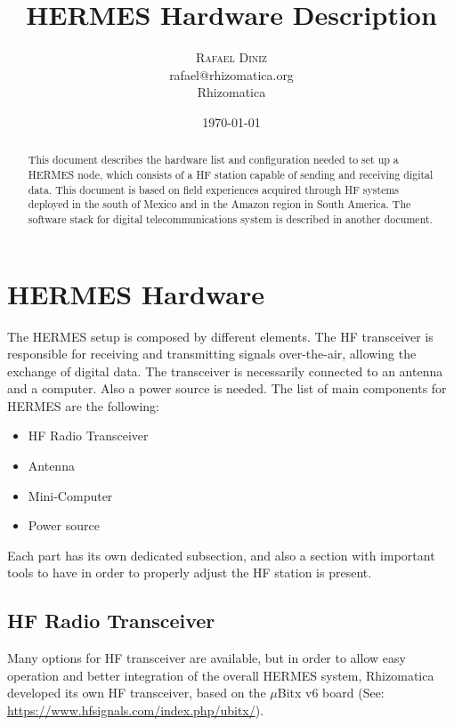 \documentclass[11pt,a4paper]{article}
\title{HERMES Hardware Description}
\author{
       \large
        \textsc{Rafael Diniz}
        \mbox{}\\ %
        rafael@rhizomatica.org\\
        \mbox{Rhizomatica} \\ %
}
\date{\today}
\begin{document}
\maketitle

\begin{abstract}
This document describes the hardware list and configuration needed to set up
a HERMES node, which consists of a HF station capable
of sending and receiving digital data. This document is based on field
experiences acquired through HF systems deployed in the south of Mexico
and in the Amazon region in South America. The software stack for digital
telecommunications system is described in another document.
\end{abstract}

\newpage

\tableofcontents

\section{HERMES Hardware}

The HERMES setup is composed by different elements. The HF
transceiver is responsible for receiving and transmitting signals
over-the-air, allowing the exchange of digital data. The transceiver
is necessarily connected to an antenna and a computer. Also a power source
is needed. The list of main components for HERMES are the following:

\begin{itemize}
\item HF Radio Transceiver
\item Antenna
\item Mini-Computer
\item Power source
\end{itemize}

Each part has its own dedicated subsection, and also a section with
important tools to have in order to properly adjust the HF station is
present.

\subsection{HF Radio Transceiver}

Many options for HF transceiver are available, but in order to allow easy
operation and better integration of the overall HERMES system, Rhizomatica
developed its own HF transceiver, based on the $\mu$Bitx v6 board (See:
\url{https://www.hfsignals.com/index.php/ubitx/}).
\end{document}
